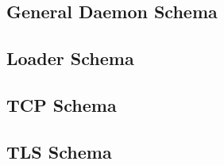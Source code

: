 \documentclass{article}
\begin{document}
\subsection{General Daemon Schema}


\subsection{Loader Schema}


\subsection{TCP Schema}


\subsection{TLS Schema}


\end{document}
